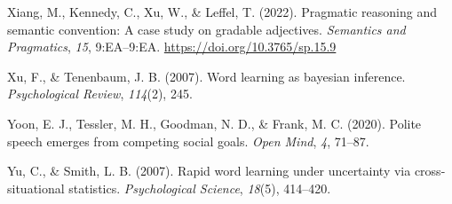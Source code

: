 \documentclass[
  english,
  man,floatsintext]{apa6}
\newlength{\cslhangindent}
\newenvironment{cslreferences}%
  {\setlength{\parindent}{0pt}%
  \everypar{\setlength{\hangindent}{\cslhangindent}}\ignorespaces}%
  {\par}
\begin{document}
\begin{cslreferences}
\leavevmode\hypertarget{ref-xiang_pragmatic_2022}{}%
Xiang, M., Kennedy, C., Xu, W., \& Leffel, T. (2022). Pragmatic reasoning and semantic convention: A case study on gradable adjectives. \emph{Semantics and Pragmatics}, \emph{15}, 9:EA--9:EA. \url{https://doi.org/10.3765/sp.15.9}

\leavevmode\hypertarget{ref-xu2007}{}%
Xu, F., \& Tenenbaum, J. B. (2007). Word learning as bayesian inference. \emph{Psychological Review}, \emph{114}(2), 245.

\leavevmode\hypertarget{ref-yoon2020}{}%
Yoon, E. J., Tessler, M. H., Goodman, N. D., \& Frank, M. C. (2020). Polite speech emerges from competing social goals. \emph{Open Mind}, \emph{4}, 71--87.

\leavevmode\hypertarget{ref-yu2007}{}%
Yu, C., \& Smith, L. B. (2007). Rapid word learning under uncertainty via cross-situational statistics. \emph{Psychological Science}, \emph{18}(5), 414--420.
\end{cslreferences}
\end{document}

